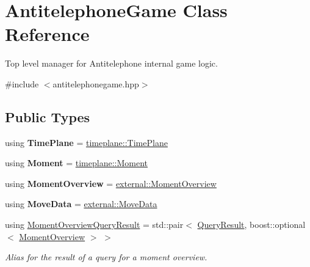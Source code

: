 \hypertarget{class_antitelephone_game}{}\section{Antitelephone\+Game Class Reference}
\label{class_antitelephone_game}


Top level manager for Antitelephone internal game logic.  




{\ttfamily \#include $<$antitelephonegame.\+hpp$>$}

\subsection*{Public Types}
\begin{DoxyCompactItemize}
\item 
\mbox{\label{class_antitelephone_game_a6f5bff3c072b992022d47276f2684848}} 
using {\bfseries Time\+Plane} = \hyperlink{classtimeplane_1_1_time_plane}{timeplane\+::\+Time\+Plane}
\item 
\mbox{\label{class_antitelephone_game_a8f68b4de9218b82ecfc9ebd24fc57813}} 
using {\bfseries Moment} = \hyperlink{classtimeplane_1_1_moment}{timeplane\+::\+Moment}
\item 
\mbox{\label{class_antitelephone_game_abada6d8d7931cf15fd1eb4b6290d7c15}} 
using {\bfseries Moment\+Overview} = \hyperlink{classexternal_1_1_moment_overview}{external\+::\+Moment\+Overview}
\item 
\mbox{\label{class_antitelephone_game_a8c579f8757044c9515a61a997af44701}} 
using {\bfseries Move\+Data} = \hyperlink{classexternal_1_1_move_data}{external\+::\+Move\+Data}
\item 
\mbox{\label{class_antitelephone_game_a99ab937cb4918da1c80bd8d07e43f920}} 
using \hyperlink{class_antitelephone_game_a99ab937cb4918da1c80bd8d07e43f920}{Moment\+Overview\+Query\+Result} = std\+::pair$<$ \hyperlink{class_query_result}{Query\+Result}, boost\+::optional$<$ \hyperlink{classexternal_1_1_moment_overview}{Moment\+Overview} $>$ $>$
\begin{DoxyCompactList}\small\item\em Alias for the result of a query for a moment overview. \end{DoxyCompactList}\item 

\end{DoxyCompactItemize}
